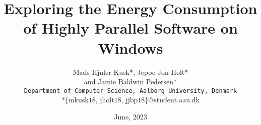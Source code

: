\documentclass[a4paper, 10pt, english]{article}
\begin{document}
\newpage
\title{\huge Exploring the Energy Consumption of Highly Parallel  Software on Windows}
\author{
Mads Hjuler Kusk*, Jeppe Jon Holt*\\ and Jamie Baldwin Pedersen*\\
\texttt{Department of Computer Science, Aalborg University, Denmark}\\
*\texttt{$\text{\{mkusk18, jholt18, jjbp18\}@student.aau.dk}$}
}
\date{{\Large June, 2023}}

\thispagestyle{empty}

\newpage
\leavevmode\thispagestyle{empty}\newpage
\maketitle

\setcounter{page}{1}


%
%
% 
% 
% 
% 
% 
% 
% 
% 
% 
% 
% 
\newpage
\begin{multicols}{2}[\printbibheading]
\printbibliography[heading=none]
\end{multicols}

\appendix

\end{document}
